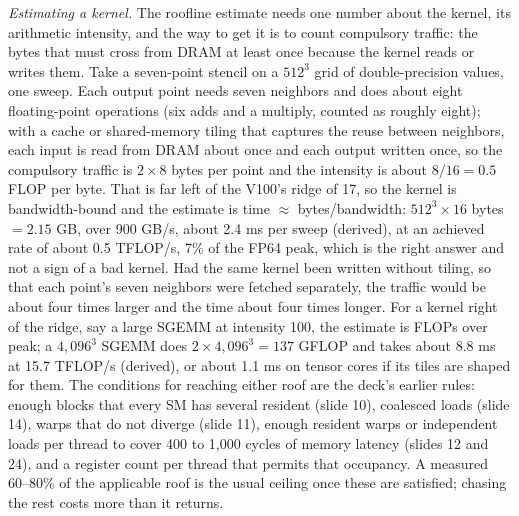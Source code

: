\documentclass[11pt,letterpaper]{article}
\begin{document}
\emph{Estimating a kernel.} The roofline estimate needs one number about the kernel, its arithmetic intensity, and the way to get it is to count compulsory traffic: the bytes that must cross from DRAM at least once because the kernel reads or writes them. Take a seven-point stencil on a $512^3$ grid of double-precision values, one sweep. Each output point needs seven neighbors and does about eight floating-point operations (six adds and a multiply, counted as roughly eight); with a cache or shared-memory tiling that captures the reuse between neighbors, each input is read from DRAM about once and each output written once, so the compulsory traffic is $2 \times 8$ bytes per point and the intensity is about $8/16 = 0.5$ FLOP per byte. That is far left of the V100's ridge of 17, so the kernel is bandwidth-bound and the estimate is time $\approx$ bytes/bandwidth: $512^3 \times 16$ bytes $= 2.15$ GB, over 900 GB/s, about 2.4 ms per sweep (derived), at an achieved rate of about 0.5 TFLOP/s, 7\% of the FP64 peak, which is the right answer and not a sign of a bad kernel. Had the same kernel been written without tiling, so that each point's seven neighbors were fetched separately, the traffic would be about four times larger and the time about four times longer. For a kernel right of the ridge, say a large SGEMM at intensity 100, the estimate is FLOPs over peak; a $4{,}096^3$ SGEMM does $2 \times 4{,}096^3 = 137$ GFLOP and takes about 8.8 ms at 15.7 TFLOP/s (derived), or about 1.1 ms on tensor cores if its tiles are shaped for them. The conditions for reaching either roof are the deck's earlier rules: enough blocks that every SM has several resident (slide 10), coalesced loads (slide 14), warps that do not diverge (slide 11), enough resident warps or independent loads per thread to cover 400 to 1,000 cycles of memory latency (slides 12 and 24), and a register count per thread that permits that occupancy. A measured 60--80\% of the applicable roof is the usual ceiling once these are satisfied; chasing the rest costs more than it returns.
\end{document}
